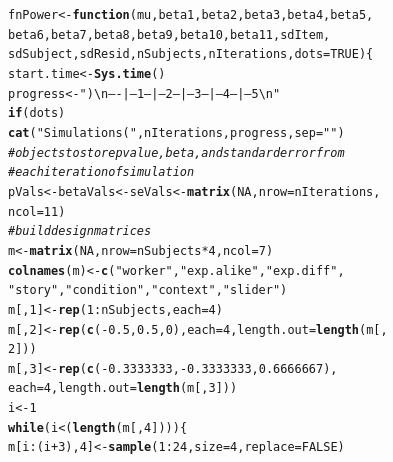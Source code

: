 \documentclass{sp}\usepackage[]{graphicx}\usepackage[]{color}
\makeatletter
\newcommand{\hlnum}[1]{\textcolor[rgb]{0.686,0.059,0.569}{#1}}%
\newcommand{\hlstr}[1]{\textcolor[rgb]{0.192,0.494,0.8}{#1}}%
\newcommand{\hlcom}[1]{\textcolor[rgb]{0.678,0.584,0.686}{\textit{#1}}}%
\newcommand{\hlopt}[1]{\textcolor[rgb]{0,0,0}{#1}}%
\newcommand{\hlstd}[1]{\textcolor[rgb]{0.345,0.345,0.345}{#1}}%
\newcommand{\hlkwa}[1]{\textcolor[rgb]{0.161,0.373,0.58}{\textbf{#1}}}%
\newcommand{\hlkwb}[1]{\textcolor[rgb]{0.69,0.353,0.396}{#1}}%
\newcommand{\hlkwc}[1]{\textcolor[rgb]{0.333,0.667,0.333}{#1}}%
\newcommand{\hlkwd}[1]{\textcolor[rgb]{0.737,0.353,0.396}{\textbf{#1}}}%
\newenvironment{kframe}{%
 \def\at@end@of@kframe{}%
 \ifinner\ifhmode%
  \def\at@end@of@kframe{\end{minipage}}%
  \begin{minipage}{\columnwidth}%
 \fi\fi%
 \def\FrameCommand##1{\hskip\@totalleftmargin \hskip-\fboxsep
 \colorbox{shadecolor}{##1}\hskip-\fboxsep
     \hskip-\linewidth \hskip-\@totalleftmargin \hskip\columnwidth}%
 \MakeFramed {\advance\hsize-\width
   \@totalleftmargin\z@ \linewidth\hsize
   \@setminipage}}%
 {\par\unskip\endMakeFramed%
 \at@end@of@kframe}
\newenvironment{knitrout}{}{} %
\makeatother
\begin{document}
\begin{knitrout}
\begin{kframe}
\begin{alltt}
\hlstd{fnPower} \hlkwb{<-} \hlkwa{function}\hlstd{(}\hlkwc{mu}\hlstd{,} \hlkwc{beta1}\hlstd{,} \hlkwc{beta2}\hlstd{,} \hlkwc{beta3}\hlstd{,} \hlkwc{beta4}\hlstd{,} \hlkwc{beta5}\hlstd{,}
    \hlkwc{beta6}\hlstd{,} \hlkwc{beta7}\hlstd{,} \hlkwc{beta8}\hlstd{,} \hlkwc{beta9}\hlstd{,} \hlkwc{beta10}\hlstd{,} \hlkwc{beta11}\hlstd{,} \hlkwc{sdItem}\hlstd{,}
    \hlkwc{sdSubject}\hlstd{,} \hlkwc{sdResid}\hlstd{,} \hlkwc{nSubjects}\hlstd{,} \hlkwc{nIterations}\hlstd{,} \hlkwc{dots} \hlstd{=} \hlnum{TRUE}\hlstd{) \{}
    \hlstd{start.time} \hlkwb{<-} \hlkwd{Sys.time}\hlstd{()}
    \hlstd{progress} \hlkwb{<-} \hlstr{") \textbackslash{}n----|--- 1 ---|--- 2 ---|--- 3 ---|--- 4 ---| --- 5 \textbackslash{}n"}
    \hlkwa{if} \hlstd{(dots)}
        \hlkwd{cat}\hlstd{(}\hlstr{"Simulations ("}\hlstd{, nIterations, progress,} \hlkwc{sep} \hlstd{=} \hlstr{""}\hlstd{)}
    \hlcom{# objects to store pvalue, beta, and standard error from}
    \hlcom{# each iteration of simulation}
    \hlstd{pVals} \hlkwb{<-} \hlstd{betaVals} \hlkwb{<-} \hlstd{seVals} \hlkwb{<-} \hlkwd{matrix}\hlstd{(}\hlnum{NA}\hlstd{,} \hlkwc{nrow} \hlstd{= nIterations,}
        \hlkwc{ncol} \hlstd{=} \hlnum{11}\hlstd{)}
    \hlcom{# build design matrices}
    \hlstd{m} \hlkwb{<-} \hlkwd{matrix}\hlstd{(}\hlnum{NA}\hlstd{,} \hlkwc{nrow} \hlstd{= nSubjects} \hlopt{*} \hlnum{4}\hlstd{,} \hlkwc{ncol} \hlstd{=} \hlnum{7}\hlstd{)}
    \hlkwd{colnames}\hlstd{(m)} \hlkwb{<-} \hlkwd{c}\hlstd{(}\hlstr{"worker"}\hlstd{,} \hlstr{"exp.alike"}\hlstd{,} \hlstr{"exp.diff"}\hlstd{,}
        \hlstr{"story"}\hlstd{,} \hlstr{"condition"}\hlstd{,} \hlstr{"context"}\hlstd{,} \hlstr{"slider"}\hlstd{)}
    \hlstd{m[,} \hlnum{1}\hlstd{]} \hlkwb{<-} \hlkwd{rep}\hlstd{(}\hlnum{1}\hlopt{:}\hlstd{nSubjects,} \hlkwc{each} \hlstd{=} \hlnum{4}\hlstd{)}
    \hlstd{m[,} \hlnum{2}\hlstd{]} \hlkwb{<-} \hlkwd{rep}\hlstd{(}\hlkwd{c}\hlstd{(}\hlopt{-}\hlnum{0.5}\hlstd{,} \hlnum{0.5}\hlstd{,} \hlnum{0}\hlstd{),} \hlkwc{each} \hlstd{=} \hlnum{4}\hlstd{,} \hlkwc{length.out} \hlstd{=} \hlkwd{length}\hlstd{(m[,}
        \hlnum{2}\hlstd{]))}
    \hlstd{m[,} \hlnum{3}\hlstd{]} \hlkwb{<-} \hlkwd{rep}\hlstd{(}\hlkwd{c}\hlstd{(}\hlopt{-}\hlnum{0.3333333}\hlstd{,} \hlopt{-}\hlnum{0.3333333}\hlstd{,} \hlnum{0.6666667}\hlstd{),}
        \hlkwc{each} \hlstd{=} \hlnum{4}\hlstd{,} \hlkwc{length.out} \hlstd{=} \hlkwd{length}\hlstd{(m[,} \hlnum{3}\hlstd{]))}
    \hlstd{i} \hlkwb{<-} \hlnum{1}
    \hlkwa{while} \hlstd{(i} \hlopt{<} \hlstd{(}\hlkwd{length}\hlstd{(m[,} \hlnum{4}\hlstd{]))) \{}
        \hlstd{m[i}\hlopt{:}\hlstd{(i} \hlopt{+} \hlnum{3}\hlstd{),} \hlnum{4}\hlstd{]} \hlkwb{<-} \hlkwd{sample}\hlstd{(}\hlnum{1}\hlopt{:}\hlnum{24}\hlstd{,} \hlkwc{size} \hlstd{=} \hlnum{4}\hlstd{,} \hlkwc{replace} \hlstd{=} \hlnum{FALSE}\hlstd{)}

\end{alltt}
\end{kframe}
\end{knitrout}
\end{document}
